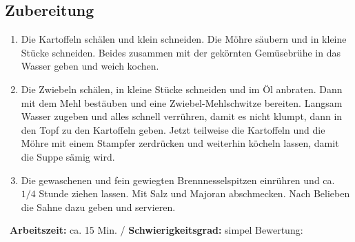 \begin{minipage}[t]{0.58\textwidth}
\vspace{0pt}
\subsection*{Zubereitung}
\begin{enumerate}[leftmargin=*, itemindent=14pt]
\item Die Kartoffeln schälen und klein schneiden. Die Möhre säubern und in kleine Stücke schneiden. Beides zusammen mit der gekörnten Gemüsebrühe in das Wasser geben und weich kochen.\\

\item Die Zwiebeln schälen, in kleine Stücke schneiden und im Öl anbraten. Dann mit dem Mehl bestäuben und eine Zwiebel-Mehlschwitze bereiten. Langsam Wasser zugeben und alles schnell verrühren, damit es nicht klumpt, dann in den Topf zu den Kartoffeln geben. Jetzt teilweise die Kartoffeln und die Möhre mit einem Stampfer zerdrücken und weiterhin köcheln lassen, damit die Suppe sämig wird.\\

\item Die gewaschenen und fein gewiegten Brennnesselspitzen einrühren und ca. $1/4$ Stunde ziehen lassen. Mit Salz und Majoran abschmecken. Nach Belieben die Sahne dazu geben und servieren.
\end{enumerate}
\end{minipage}
\vfill
\decothreeright \, \textbf{Arbeitszeit:} ca. 15 Min. / \textbf{Schwierigkeitsgrad:} simpel \decothreeleft \hfill Bewertung: \CIRCLE  \CIRCLE \CIRCLE \CIRCLE \CIRCLE 